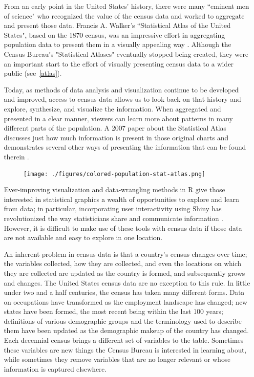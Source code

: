 \documentclass[DIV=calc, paper=a4, fontsize=10pt, twocolumn]{scrartcl}\usepackage[]{graphicx}\usepackage[]{color}
\begin{document}
\par From an early point in the United States' history, there were many ``eminent men of science" who recognized the value of the census data and worked to aggregate and present those data. Francis A. Walker's ``Statistical Atlas of the United States", based on the 1870 census, was an impressive effort in aggregating population data to present them in a visually appealing way \citep{StatisticalAtlas}. Although the Census Bureau's "Statistical Atlases" eventually stopped being created, they were an important start to the effort of visually presenting census data to a wider public (see~\autoref{atlas}).


\par Today, as methods of data analysis and visualization continue to be developed and improved, access to census data allows us to look back on that history and explore, synthesize, and visualize the information. When aggregated and presented in a clear manner, viewers can learn more about patterns in many different parts of the population. A 2007 paper about the Statistical Atlas discusses just how much information is present in those original charts and demonstrates several other ways of presenting the information that can be found therein \citep{ChartInterview}.  

\begin{figure}[hbtp]
\centering
\texttt{[image: ./figures/colored-population-stat-atlas.png]}  
\label{atlas}
\end{figure}

\par Ever-improving visualization and data-wrangling methods in R \citep{RCoreTeam} give those interested in statistical graphics a wealth of opportunities to explore and learn from data; in particular, incorporating user interactivity using Shiny has revolutionized the way statisticians share and communicate information \citep{Shiny}. However, it is difficult to make use of these tools with census data if those data are not available and easy to explore in one location.  

\par An inherent problem in census data is that a country's census changes over time; the variables collected, how they are collected, and even the locations on which they are collected are updated as the country is formed, and subsequently grows and changes. The United States census data are no exception to this rule. In little under two and a half centuries, the census has taken many different forms. Data on occupations have transformed as the employment landscape has changed; new states have been formed, the most recent being within the last 100 years; definitions of various demographic groups and the terminology used to describe them have been updated as the demographic makeup of the country has changed. Each decennial census brings a different set of variables to the table. Sometimes these variables are new things the Census Bureau is interested in learning about, while sometimes they remove variables that are no longer relevant or whose information is captured elsewhere.  
\end{document}
